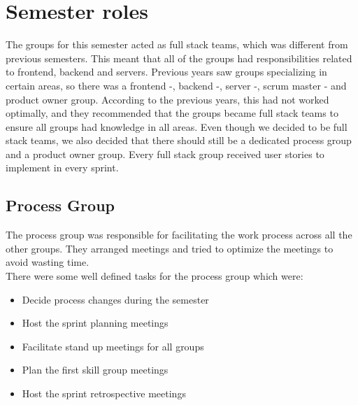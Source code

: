 \section{Semester roles}
The groups for this semester acted as full stack teams, which was different from previous semesters. 
This meant that all of the groups had responsibilities related to frontend, backend and servers.
Previous years saw groups specializing in certain areas, so there was a frontend -, backend -, server -, scrum master - and product owner group. 
According to the previous years, this had not worked optimally, and they recommended that the groups became full stack teams to ensure all groups had knowledge in all areas.
Even though we decided to be full stack teams, we also decided that there should still be a dedicated process group and a product owner group. 
Every full stack group received user stories to implement in every sprint.

\subsection{Process Group}
The process group was responsible for facilitating the work process across all the other groups.
They arranged meetings and tried to optimize the meetings to avoid wasting time.
\\
There were some well defined tasks for the process group which were:
\begin{itemize}
    \item Decide process changes during the semester
    \item Host the sprint planning meetings
    \item Facilitate stand up meetings for all groups
    \item Plan the first skill group meetings
    \item Host the sprint retrospective meetings
\end{itemize}
\noindent

